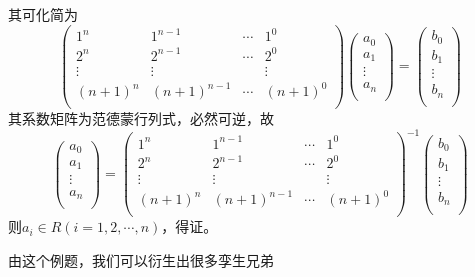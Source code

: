 \documentclass[lang=cn,10pt]{elegantbook}
\begin{document}
\begin{solution}
	其可化简为
	\begin{equation*}
		\left( \begin{matrix}
			1^n&		1^{n-1}&		\cdots&		1^0\\
			2^n&		2^{n-1}&		\cdots&		2^0\\
			\vdots&		\vdots&		&		\vdots\\
			\left( n+1 \right) ^n&		\left( n+1 \right) ^{n-1}&		\cdots&		\left( n+1 \right) ^0\\
		\end{matrix} \right) \left( \begin{array}{c}
			a_0\\
			a_1\\
			\vdots\\
			a_n\\
		\end{array} \right) =\left( \begin{array}{c}
			b_0\\
			b_1\\
			\vdots\\
			b_n\\
		\end{array} \right) 
	\end{equation*}
	其系数矩阵为范德蒙行列式，必然可逆，故
	\begin{equation*}
		\left( \begin{array}{c}
			a_0\\
			a_1\\
			\vdots\\
			a_n\\
		\end{array} \right) =\left( \begin{matrix}
			1^n&		1^{n-1}&		\cdots&		1^0\\
			2^n&		2^{n-1}&		\cdots&		2^0\\
			\vdots&		\vdots&		&		\vdots\\
			\left( n+1 \right) ^n&		\left( n+1 \right) ^{n-1}&		\cdots&		\left( n+1 \right) ^0\\
		\end{matrix} \right) ^{-1}\left( \begin{array}{c}
			b_0\\
			b_1\\
			\vdots\\
			b_n\\
		\end{array} \right) 
	\end{equation*}
	则$a_{i}\in R(i=1,2,\cdots,n)$，得证。
\end{solution}
由这个例题，我们可以衍生出很多孪生兄弟
\end{document}
